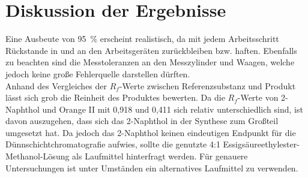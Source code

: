 \section{Diskussion der Ergebnisse}
\label{sec:diskussion}

Eine Ausbeute von \SI{95}{\percent} erscheint realistisch, da mit jedem Arbeitsschritt Rückstande in und an den Arbeitsgeräten zurückbleiben bzw. haften. Ebenfalls zu beachten sind die Messtoleranzen an den Messzylinder und Waagen, welche jedoch keine große Fehlerquelle darstellen dürften.\\

Anhand des Vergleiches der $R_f$-Werte zwischen Referenzsubstanz und Produkt lässt sich grob die Reinheit des Produktes bewerten. Da die $R_f$-Werte von 2-Naphthol und Orange II mit 0,918 und 0,411 sich relativ unterschiedlich sind, ist davon auszugehen, dass sich das 2-Naphthol in der Synthese zum Großteil umgesetzt hat. Da jedoch das 2-Naphthol keinen eindeutigen Endpunkt für die Dünnschichtchromatografie aufwies, sollte die genutzte 4:1 Essigsäureethylester-Methanol-Lösung als Laufmittel hinterfragt werden. Für genauere Untersuchungen ist unter Umständen ein alternatives Laufmittel zu verwenden.

